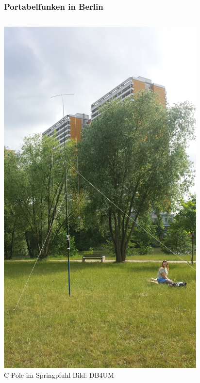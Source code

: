 \begin{frame}
    \frametitle{Portabelfunken in Berlin}
    \begin{columns}[c]
        \column[c]{5cm}
        \begin{center}
        \includegraphics[width=0.82\textwidth]{a09/db4um_dm1ri_portabel.jpg}\\
        \tiny C-Pole im Springpfuhl Bild: DB4UM
    \end{center}
    \column{5cm} \large
        \begin{center}

\end{center}
\end{columns}
\end{frame}
